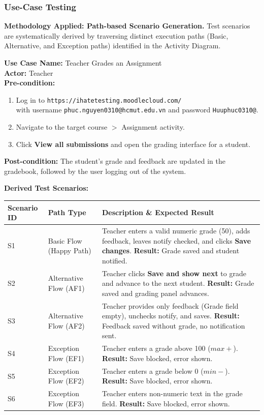 \documentclass[twoside,final]{hcmut-report}
\begin{document}
\subsubsection{Use-Case Testing}
\textbf{Methodology Applied: Path-based Scenario Generation.} 
Test scenarios are systematically derived by traversing distinct execution paths (Basic, Alternative, and Exception paths) identified in the Activity Diagram.

\vspace{0.2cm}
\noindent\textbf{Use Case Name:} Teacher Grades an Assignment \\
\textbf{Actor:} Teacher \\
\textbf{Pre-condition:} 
\begin{enumerate}
    \item Log in to \texttt{https://ihatetesting.moodlecloud.com/}\\ with username \texttt{phuc.nguyen0310@hcmut.edu.vn} and password \texttt{Huuphuc0310@}.
    \item Navigate to the target course $>$ Assignment activity.
    \item Click \textbf{View all submissions} and open the grading interface for a student.
\end{enumerate}
\textbf{Post-condition:} The student's grade and feedback are updated in the gradebook, followed by the user logging out of the system.

\vspace{0.3cm}
\noindent\textbf{Derived Test Scenarios:}
\begin{table}[H]
\centering
\renewcommand{\arraystretch}{1.2}
\begin{tabularx}{\textwidth}{|l|l|X|}
\hline
\textbf{Scenario ID} & \textbf{Path Type} & \textbf{Description \& Expected Result} \\ \hline
S1 & Basic Flow (Happy Path) & Teacher enters a valid numeric grade (50), adds feedback, leaves notify checked, and clicks \textbf{Save changes}. \textbf{Result:} Grade saved and student notified. \\ \hline
S2 & Alternative Flow (AF1) & Teacher clicks \textbf{Save and show next} to grade and advance to the next student. \textbf{Result:} Grade saved and grading panel advances. \\ \hline
S3 & Alternative Flow (AF2) & Teacher provides only feedback (Grade field empty), unchecks notify, and saves. \textbf{Result:} Feedback saved without grade, no notification sent. \\ \hline
S4 & Exception Flow (EF1) & Teacher enters a grade above 100 ($max+$). \textbf{Result:} Save blocked, error shown. \\ \hline
S5 & Exception Flow (EF2) & Teacher enters a grade below 0 ($min-$). \textbf{Result:} Save blocked, error shown. \\ \hline
S6 & Exception Flow (EF3) & Teacher enters non-numeric text in the grade field. \textbf{Result:} Save blocked, error shown. \\ \hline
\end{tabularx}
\end{table}
\end{document}
